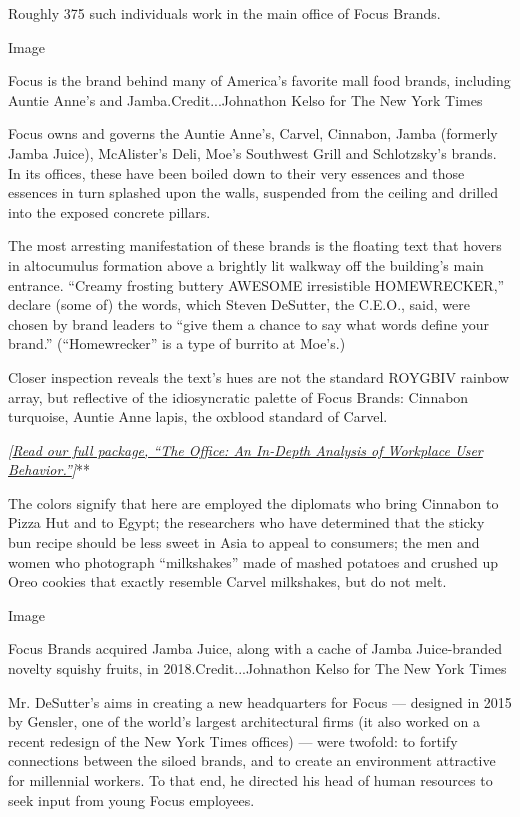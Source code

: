 Roughly 375 such individuals work in the main office of Focus Brands.

Image

Focus is the brand behind many of America's favorite mall food brands,
including Auntie Anne's and Jamba.Credit...Johnathon Kelso for The New
York Times

Focus owns and governs the Auntie Anne's, Carvel, Cinnabon, Jamba
(formerly Jamba Juice), McAlister's Deli, Moe's Southwest Grill and
Schlotzsky's brands. In its offices, these have been boiled down to
their very essences and those essences in turn splashed upon the walls,
suspended from the ceiling and drilled into the exposed concrete
pillars.

The most arresting manifestation of these brands is the floating text
that hovers in altocumulus formation above a brightly lit walkway off
the building's main entrance. ``Creamy frosting buttery AWESOME
irresistible HOMEWRECKER,'' declare (some of) the words, which Steven
DeSutter, the C.E.O., said, were chosen by brand leaders to ``give them
a chance to say what words define your brand.'' (``Homewrecker'' is a
type of burrito at Moe's.)

Closer inspection reveals the text's hues are not the standard ROYGBIV
rainbow array, but reflective of the idiosyncratic palette of Focus
Brands: Cinnabon turquoise, Auntie Anne lapis, the oxblood standard of
Carvel.

\emph{\emph{\emph{{[}}\href{https://www.nytimes.com/interactive/2019/09/17/style/the-office.html}{\emph{Read
our full package, ``The Office: An In-Depth Analysis of Workplace User
Behavior.''}}}{]}}**

The colors signify that here are employed the diplomats who bring
Cinnabon to Pizza Hut and to Egypt; the researchers who have determined
that the sticky bun recipe should be less sweet in Asia to appeal to
consumers; the men and women who photograph ``milkshakes'' made of
mashed potatoes and crushed up Oreo cookies that exactly resemble Carvel
milkshakes, but do not melt.

Image

Focus Brands acquired Jamba Juice, along with a cache of Jamba
Juice-branded novelty squishy fruits, in 2018.Credit...Johnathon Kelso
for The New York Times

Mr. DeSutter's aims in creating a new headquarters for Focus ---
designed in 2015 by Gensler, one of the world's largest architectural
firms (it also worked on a recent redesign of the New York Times
offices) --- were twofold: to fortify connections between the siloed
brands, and to create an environment attractive for millennial workers.
To that end, he directed his head of human resources to seek input from
young Focus employees.

